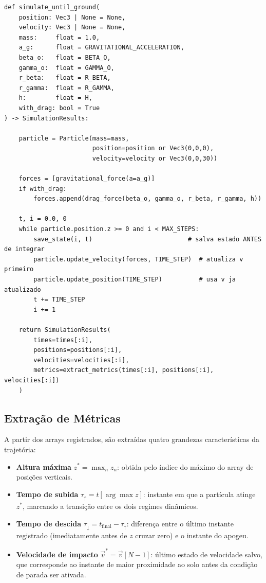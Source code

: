 \begin{lstlisting}[caption={Laço de integração - Euler simplético com salvamento de estado}, label={lst:sim}]
def simulate_until_ground(
    position: Vec3 | None = None,
    velocity: Vec3 | None = None,
    mass:     float = 1.0,
    a_g:      float = GRAVITATIONAL_ACCELERATION,
    beta_o:   float = BETA_O,
    gamma_o:  float = GAMMA_O,
    r_beta:   float = R_BETA,
    r_gamma:  float = R_GAMMA,
    h:        float = H,
    with_drag: bool = True
) -> SimulationResults:

    particle = Particle(mass=mass,
                        position=position or Vec3(0,0,0),
                        velocity=velocity or Vec3(0,0,30))

    forces = [gravitational_force(a=a_g)]
    if with_drag:
        forces.append(drag_force(beta_o, gamma_o, r_beta, r_gamma, h))

    t, i = 0.0, 0
    while particle.position.z >= 0 and i < MAX_STEPS:
        save_state(i, t)                          # salva estado ANTES de integrar
        particle.update_velocity(forces, TIME_STEP)  # atualiza v primeiro
        particle.update_position(TIME_STEP)          # usa v ja atualizado
        t += TIME_STEP
        i += 1

    return SimulationResults(
        times=times[:i],
        positions=positions[:i],
        velocities=velocities[:i],
        metrics=extract_metrics(times[:i], positions[:i], velocities[:i])
    )
\end{lstlisting}

\subsection{Extração de Métricas}

A partir dos arrays registrados, são extraídas quatro grandezas características da trajetória:

\begin{itemize}
    \item \textbf{Altura máxima} $z^* = \max_n z_n$: obtida pelo índice do máximo do array de posições verticais.
    \item \textbf{Tempo de subida} $\tau_\uparrow = t[\arg\max z]$: instante em que a partícula atinge $z^*$, marcando a transição entre os dois regimes dinâmicos.
    \item \textbf{Tempo de descida} $\tau_\downarrow = t_\text{final} - \tau_\uparrow$: diferença entre o último instante registrado (imediatamente antes de $z$ cruzar zero) e o instante do apogeu.
    \item \textbf{Velocidade de impacto} $\vec{v}^* = \vec{v}[N-1]$: último estado de velocidade salvo, que corresponde ao instante de maior proximidade ao solo antes da condição de parada ser ativada.
\end{itemize}

